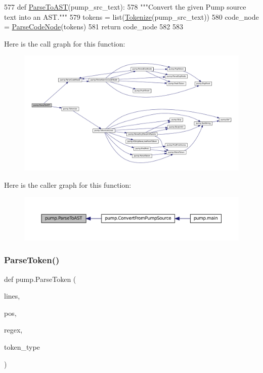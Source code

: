 \begin{DoxyCode}
577 \textcolor{keyword}{def }\hyperlink{namespacepump_a56ac10a83a3a875d305c9aae71fc0549}{ParseToAST}(pump\_src\_text):
578   \textcolor{stringliteral}{"""Convert the given Pump source text into an AST."""}
579   tokens = list(\hyperlink{namespacepump_aa42c23b1c914c0f86a94f2fa32999905}{Tokenize}(pump\_src\_text))
580   code\_node = \hyperlink{namespacepump_aabbc064b8664abbe05618b3a0f5a6c38}{ParseCodeNode}(tokens)
581   \textcolor{keywordflow}{return} code\_node
582 
583 
\end{DoxyCode}
Here is the call graph for this function\+:
\nopagebreak
\begin{figure}[H]
\begin{center}
\leavevmode
\includegraphics[width=350pt]{namespacepump_a56ac10a83a3a875d305c9aae71fc0549_cgraph}
\end{center}
\end{figure}
Here is the caller graph for this function\+:
\nopagebreak
\begin{figure}[H]
\begin{center}
\leavevmode
\includegraphics[width=350pt]{namespacepump_a56ac10a83a3a875d305c9aae71fc0549_icgraph}
\end{center}
\end{figure}
\mbox{\label{namespacepump_a23761d99dd43d642e94d845218573035}} 
\subsubsection{\texorpdfstring{Parse\+Token()}{ParseToken()}}
{\footnotesize\ttfamily def pump.\+Parse\+Token (\begin{DoxyParamCaption}\item[{}]{lines,  }\item[{}]{pos,  }\item[{}]{regex,  }\item[{}]{token\+\_\+type }\end{DoxyParamCaption})}



